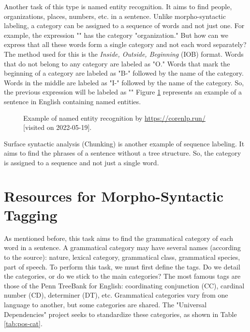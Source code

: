 \documentclass{KBook}
\begin{document}
Another task of this type is named entity recognition.
It aims to find people, organizations, places, numbers, etc. in a sentence.
Unlike morpho-syntactic labeling, a category can be assigned to a sequence of words and not just one.
For example, the expression "" has the category "organization."
But how can we express that all these words form a single category and not each word separately?
The method used for this is the \textit{Inside, Outside, Beginning} (IOB) format.
Words that do not belong to any category are labeled as "O."
Words that mark the beginning of a category are labeled as "B-" followed by the name of the category.
Words in the middle are labeled as "I-" followed by the name of the category.
So, the previous expression will be labeled as ""
Figure \ref{fig:ner-exp} represents an example of a sentence in English containing named entities.
\begin{figure}[ht]
	\centering
	\caption[Example of named entity recognition.]{Example of named entity recognition by \url{https://corenlp.run/} [visited on 2022-05-19].}
	\label{fig:ner-exp}
\end{figure}

Surface syntactic analysis (Chunking) is another example of sequence labeling.
It aims to find the phrases of a sentence without a tree structure.
So, the category is assigned to a sequence and not just a single word.


\section{Resources for Morpho-Syntactic Tagging}

As mentioned before, this task aims to find the grammatical category of each word in a sentence.
A grammatical category may have several names (according to the source): nature, lexical category, grammatical class, grammatical species, part of speech.
To perform this task, we must first define the tags.
Do we detail the categories, or do we stick to the main categories?
The most famous tags are those of the Penn TreeBank for English: coordinating conjunction (CC), cardinal number (CD), determiner (DT), etc.
Grammatical categories vary from one language to another, but some categories are shared.
The "Universal Dependencies" project seeks to standardize these categories, as shown in Table \ref{tab:pos-cat}.
\end{document}
